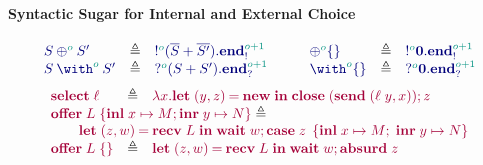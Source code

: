 \documentclass[main.tex]{subfiles}
\begin{document}
\paragraph*{Syntactic Sugar for Internal and External Choice}
\[
\begin{array}{lcl}
  \ty{\tyselect[\cs{o}]{S}{S'}}
  & \elabarrow & \ty{\tysend[\cs{o}]{(\tysum{\co{S}}{\co{S'}})}{\tyends[\cs{o+1}]}} \\
  \ty{\tyoffer[\cs{o}]{S}{S'}}
  & \elabarrow & \ty{\tyrecv[\cs{o}]{(\tysum{S}{S'})}{\tyendr[\cs{o+1}]}} \\
\end{array}
\qquad
\begin{array}{lcl}
  \ty{\tyselectemp[\cs{o}]}
  & \elabarrow & \ty{\tysend[\cs{o}]{\tyvoid}{\tyends[\cs{o+1}]}} \\
  \ty{\tyofferemp[\cs{o}]}
  & \elabarrow & \ty{\tyrecv[\cs{o}]{\tyvoid}{\tyendr[\cs{o+1}]}} \\
\end{array}
\]
\[
\begin{array}{lcl}
  \tm{\select{\ell}}
  & \elabarrow & \tm{\lambda x.\letpair{y}{z}{\new}{\andthen{\close\;(\send\;{\pair{\ell\;y}{x}})}{z}}} \\
  \multicolumn{3}{l}{\tm{\offer{L}{x}{M}{y}{N}}\elabarrow} \\
  \multicolumn{3}{l}{
  \qquad\tm{\letpair{z}{w}{\recv\;{L}}{\andthen{\wait\;{w}}{\casesum{z}{x}{M}{y}{N}}}}} \\
  \tm{\offeremp{L}}
  & \elabarrow & \tm{\letpair{z}{w}{\recv\;L}{\andthen{\wait\;{w}}{\absurd{z}}}}
\end{array}
\]
\end{document}
